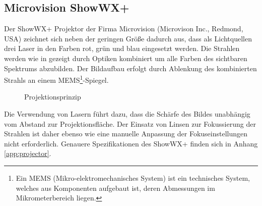 
\subsection{Microvision ShowWX+\textsuperscript{\texttrademark}}%
\label{chap.projector}
Der ShowWX+\textsuperscript{\texttrademark} Projektor der Firma Microvision (Microvison Inc., Redmond, USA) zeichnet sich neben der geringen Größe dadurch aus, dass als Lichtquellen drei Laser in den Farben rot, grün und blau eingesetzt werden. Die Strahlen werden wie in  gezeigt durch Optiken kombiniert um alle Farben des sichtbaren Spektrums abzubilden. Der Bildaufbau erfolgt durch Ablenkung des kombinierten Strahls an einem MEMS\footnote{Ein MEMS (Mikro-elektromechanisches System) ist ein technisches System, welches aus Komponenten aufgebaut ist, deren Abmessungen im Mikrometerbereich liegen.}-Spiegel.

\begin{figure}[ht]
	\begin{center}
		\caption{Projektionsprinzip}
		\label{fig.projtech}
	\end{center}
\end{figure}

Die Verwendung von Lasern führt dazu, dass die Schärfe des Bildes unabhängig vom Abstand zur Projektionsfläche. Der Einsatz von Linsen zur Fokussierung der Strahlen ist daher ebenso wie eine manuelle Anpassung der Fokuseinstellungen nicht erforderlich. Genauere Spezifikationen des ShowWX+\textsuperscript{\texttrademark} finden sich in Anhang \ref{app:projector}.


